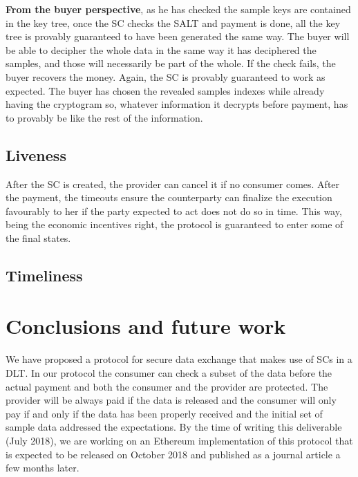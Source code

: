 \documentclass[]{article}
\begin{document}
	\textbf{From the buyer perspective}, as he has checked the sample keys are contained in the key tree, once the SC checks the SALT and payment is done, all the key tree is provably guaranteed to have been generated the same way. The buyer will be able to decipher the whole data in the same way it has deciphered the samples, and those will necessarily be part of the whole. If the check fails, the buyer recovers the money. Again, the SC is provably guaranteed to work as expected. The buyer has chosen the revealed samples indexes while already having the cryptogram so, whatever information it decrypts before payment, has to provably be like the rest of the information.
	
	\subsection{Liveness}
	After the SC is created, the provider can cancel it if no consumer comes. After the payment, the timeouts ensure the counterparty can finalize the execution favourably to her if the party expected to act does not do so in time. This way, being the economic incentives right, the protocol is guaranteed to enter some of the final states.
	\subsection{Timeliness}
	
	\section{Conclusions and future work}
	We have proposed a protocol for secure data exchange that makes use of SCs in a DLT. In our protocol the consumer can check a subset of the data before the actual payment and both the consumer and the provider are protected. The provider will be always paid if the data is released and the consumer will only pay if and only if the data has been properly received and the initial set of sample data addressed the expectations. By the time of writing this deliverable (July 2018), we are working on an Ethereum implementation of this protocol that is expected to be released on October 2018 and published as a journal article a few months later.
\end{document}
